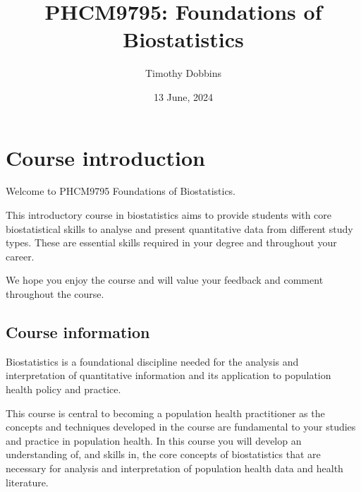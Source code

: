 \documentclass[
  a4paper,
]{memoir}
\title{PHCM9795: Foundations of Biostatistics}
\author{Timothy Dobbins}
\date{13 June, 2024}
\renewcommand*\contentsname{Table of contents}
\newcommand\contentsname{Table of contents}
\begin{document}
\frontmatter
\maketitle
\ifdefined\Shaded\renewenvironment{Shaded}{\begin{tcolorbox}[enhanced, interior hidden, breakable, borderline west={3pt}{0pt}{shadecolor}, sharp corners, frame hidden, boxrule=0pt]}{\end{tcolorbox}}\fi

\renewcommand*\contentsname{Table of contents}
{
\hypersetup{linkcolor=}
\setcounter{tocdepth}{2}
\tableofcontents
}
\mainmatter
{}

\hypertarget{course-introduction}{%
\chapter*{Course introduction}\label{course-introduction}}


Welcome to PHCM9795 Foundations of Biostatistics.

This introductory course in biostatistics aims to provide students with
core biostatistical skills to analyse and present quantitative data from
different study types. These are essential skills required in your
degree and throughout your career.

We hope you enjoy the course and will value your feedback and comment
throughout the course.

\hypertarget{course-information}{%
\section*{Course information}\label{course-information}}


Biostatistics is a foundational discipline needed for the analysis and
interpretation of quantitative information and its application to
population health policy and practice.

This course is central to becoming a population health practitioner as
the concepts and techniques developed in the course are fundamental to
your studies and practice in population health. In this course you will
develop an understanding of, and skills in, the core concepts of
biostatistics that are necessary for analysis and interpretation of
population health data and health literature.
\end{document}
